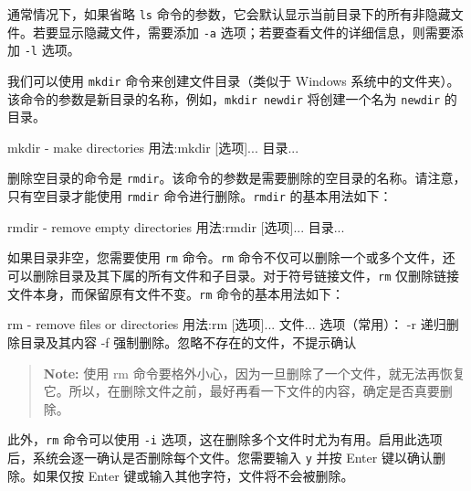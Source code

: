 通常情况下，如果省略 \texttt{ls} 命令的参数，它会默认显示当前目录下的所有非隐藏文件。若要显示隐藏文件，需要添加 \texttt{-a} 选项；若要查看文件的详细信息，则需要添加 \texttt{-l} 选项。


我们可以使用 \texttt{mkdir} 命令来创建文件目录（类似于 Windows 系统中的文件夹）。该命令的参数是新目录的名称，例如，\texttt{mkdir\ newdir} 将创建一个名为 \texttt{newdir} 的目录。

\begin{CodeBlock}[language=BookShell]
mkdir - make directories
用法:mkdir [选项]... 目录...
\end{CodeBlock}

删除空目录的命令是 \texttt{rmdir}。该命令的参数是需要删除的空目录的名称。请注意，只有空目录才能使用 \texttt{rmdir} 命令进行删除。\texttt{rmdir} 的基本用法如下：

\begin{CodeBlock}[language=BookShell]
rmdir - remove empty directories
用法:rmdir [选项]... 目录...
\end{CodeBlock}

如果目录非空，您需要使用 \texttt{rm} 命令。\texttt{rm} 命令不仅可以删除一个或多个文件，还可以删除目录及其下属的所有文件和子目录。对于符号链接文件，\texttt{rm} 仅删除链接文件本身，而保留原有文件不变。\texttt{rm} 命令的基本用法如下：

\begin{CodeBlock}[language=BookShell]
rm - remove files or directories
用法:rm [选项]... 文件...
选项（常用）：
	-r 递归删除目录及其内容
	-f 强制删除。忽略不存在的文件，不提示确认
\end{CodeBlock}

\begin{quote}
\textbf{Note:} 使用 rm 命令要格外小心，因为一旦删除了一个文件，就无法再恢复它。所以，在删除文件之前，最好再看一下文件的内容，确定是否真要删除。
\end{quote}

此外，\texttt{rm} 命令可以使用 \texttt{-i} 选项，这在删除多个文件时尤为有用。启用此选项后，系统会逐一确认是否删除每个文件。您需要输入 \texttt{y} 并按 Enter 键以确认删除。如果仅按 Enter 键或输入其他字符，文件将不会被删除。

